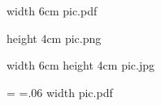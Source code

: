 
\pdfximage width 6cm {pic.pdf}  %
\pdfrefximage \pdflastximage    %

\pdfximage height 4cm {pic.png} %

\edef\MyImg{\the\pdflastximage} %
\pdfrefximage\MyImg

\pdfximage width 6cm height 4cm %
   {pic.jpg}                    %

=\hbox{\pdfrefximage\pdflastximage} %
=.06         %
\pdfximage              %
    width  {pic.pdf}  %
\pdfrefximage \pdflastximage



